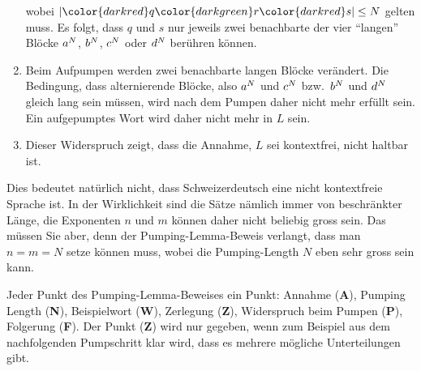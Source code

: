 \begin{loesung}
\begin{enumerate}
\begin{center}
\begin{tikzpicture}[>=latex,thick]
\end{tikzpicture}
\end{center}
wobei $|{\color{darkred}q}{\color{darkgreen}r}{\color{darkred}s}|\le N$
gelten muss.
Es folgt, dass $q$ und $s$ nur jeweils zwei benachbarte der
vier ``langen'' Blöcke $a\mathstrut^N$, $b\mathstrut^N$, $c\mathstrut^N$
oder $d\mathstrut^N$ berühren können.
\item 
Beim Aufpumpen werden zwei benachbarte langen Blöcke verändert.
Die Bedingung, dass alternierende Blöcke, also $a\mathstrut^N$ und
$c\mathstrut^N$ bzw.~$b\mathstrut^N$ und $d\mathstrut^N$ gleich lang
sein müssen, wird nach dem Pumpen daher nicht mehr erfüllt sein.
Ein aufgepumptes Wort wird daher nicht mehr in $L$ sein.
\item Dieser Widerspruch zeigt, dass die Annahme, $L$ sei kontextfrei,
nicht haltbar ist.
\qedhere
\end{enumerate}
\end{loesung}

\begin{diskussion}
Dies bedeutet natürlich nicht, dass Schweizerdeutsch eine nicht
kontextfreie Sprache ist.
In der Wirklichkeit sind die Sätze nämlich immer von beschränkter Länge,
die Exponenten $n$ und $m$ können daher nicht beliebig gross sein.
Das müssen Sie aber, denn der Pumping-Lemma-Beweis verlangt, dass man
$n=m=N$ setze können muss, wobei die Pumping-Length $N$ eben sehr gross
sein kann.
\end{diskussion}

\begin{bewertung}
Jeder Punkt des Pumping-Lemma-Beweises ein Punkt:
Annahme ({\bf A}), Pumping Length ({\bf N}), Beispielwort ({\bf W}),
Zerlegung ({\bf Z}), Widerspruch beim Pumpen ({\bf P}), 
Folgerung ({\bf F}).
Der Punkt ({\bf Z}) wird nur gegeben, wenn zum Beispiel aus dem nachfolgenden
Pumpschritt klar wird, dass es mehrere mögliche Unterteilungen gibt.
\end{bewertung}

